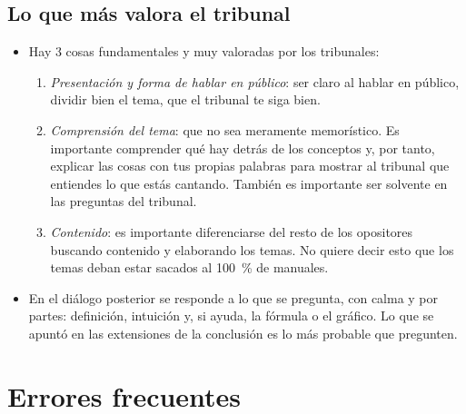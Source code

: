 \documentclass[11pt]{article}
\begin{document}
\subsection{Lo que más valora el tribunal}\label{sec:valora}

\begin{itemize}
\item Hay 3 cosas fundamentales y muy valoradas por los tribunales:
  \begin{enumerate}
  \item \emph{Presentación y forma de hablar en público}: ser claro al hablar en público, dividir bien el tema, que el tribunal te siga bien.
  \item \emph{Comprensión del tema}: que no sea meramente memorístico. Es importante comprender qué hay detrás de los conceptos y, por tanto, explicar las cosas con tus propias palabras para mostrar al tribunal que entiendes lo que estás cantando. También es importante ser solvente en las preguntas del tribunal.
  \item \emph{Contenido}: es importante diferenciarse del resto de los opositores buscando contenido y elaborando los temas. No quiere decir esto que los temas deban estar sacados al 100~\% de manuales.
  \end{enumerate}
\item En el diálogo posterior se responde a lo que se pregunta, con calma y por partes: definición, intuición y, si ayuda, la fórmula o el gráfico. Lo que se apuntó en las extensiones de la conclusión es lo más probable que pregunten.
\end{itemize}

\section{Errores frecuentes}\label{sec:errores}
\end{document}
